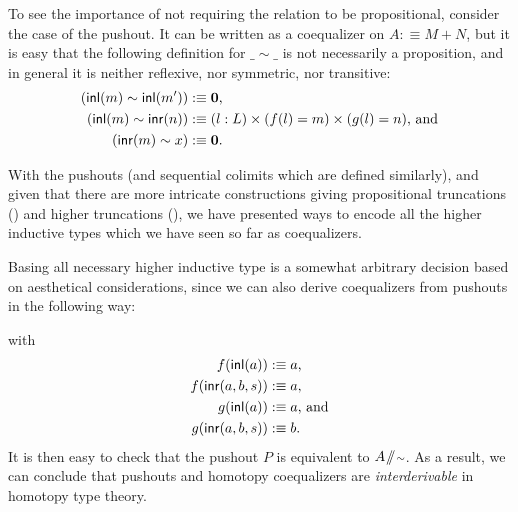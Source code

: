 To see the importance of not requiring the relation to be propositional,
consider the case of the pushout.
It can be written as a coequalizer on $A :\equiv M + N$, but it is easy that the
following definition for $\_\sim\_$ is not necessarily a proposition,
and in general it is neither reflexive, nor symmetric, nor transitive:
\begin{align*}
(\mathsf{inl}(m) \sim \mathsf{inl}(m')) &:\equiv \mathbf{0} \text{,} \\
(\mathsf{inl}(m) \sim \mathsf{inr}(n)) &:\equiv (l : L) \times (f(l) = m) \times (g(l) = n) \text{, and} \\
(\mathsf{inr}(m) \sim x) &:\equiv  \mathbf{0} \text{.}
\end{align*}

With the pushouts (and sequential colimits which are defined similarly),
and given that there are more intricate constructions giving
propositional truncations (\cite{floris_proptrunc,kraustrunc}) and higher truncations (\cite{rijke:join}),
we have presented ways to encode all the higher inductive types
which we have seen so far as coequalizers.

\begin{remark}
Basing all necessary higher inductive type is a somewhat arbitrary decision
based on aesthetical considerations, since we can also derive coequalizers
from pushouts in the following way:
\begin{center}
\end{center}
with
\begin{align*}
f(\mathsf{inl}(a)) &:\equiv a \text{,} \\
f(\mathsf{inr}(a, b, s)) &:\equiv a \text{,} \\
g(\mathsf{inl}(a)) &:\equiv a \text{, and} \\
g(\mathsf{inr}(a, b, s)) &:\equiv b \text{.}
\end{align*}
It is then easy to check that the pushout $P$ is equivalent to $A \! \sslash \! {\scriptstyle \sim}$.
As a result, we can conclude that pushouts and homotopy coequalizers
are \emph{interderivable} in homotopy type theory.
\end{remark}


